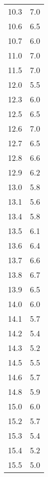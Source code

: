\begin{table}
\begin{minipage}{0.25\textwidth}
\begin{tabular}{c|c}
        10.3 &7.0\\
        10.6 &6.5\\
        10.7 &6.0\\
        11.0 &7.0\\
        11.5 &7.0\\
        12.0 &5.5\\
        12.3 &6.0\\
        12.5 &6.5\\
        12.6 &7.0\\
        12.7 &6.5\\
        12.8 &6.6\\
        12.9 &6.2\\
        13.0 &5.8\\
        13.1 &5.6\\
        13.4 &5.8\\
        13.5 &6.1\\
        13.6 &6.4\\
        13.7 &6.6\\
        13.8 &6.7\\
        13.9 &6.5\\
        14.0 &6.0\\
        14.1 &5.7\\
        14.2 &5.4\\
        14.3 &5.2\\
        14.5 &5.5\\
        14.6 &5.7\\
        14.8 &5.9\\
        15.0 &6.0\\
        15.2 &5.7\\
        15.3 &5.4\\
        15.4 &5.2\\
        15.5 &5.0\\
		\bottomrule 
	\end{tabular}
\end{minipage}
\end{table}
